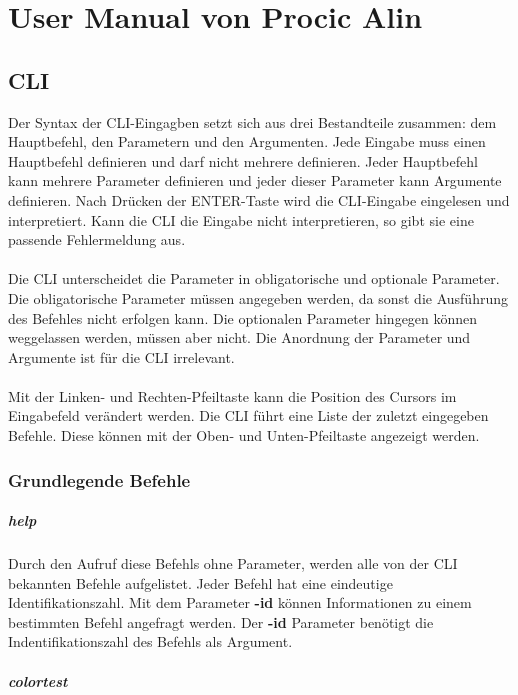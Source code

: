 \documentclass[11pt,a4paper]{report}
\begin{document}
\part{User Manual von Procic Alin}

\chapter{CLI}

Der Syntax der CLI-Eingagben setzt sich aus drei Bestandteile zusammen: dem Hauptbefehl, den Parametern und den Argumenten. Jede Eingabe muss einen Hauptbefehl definieren und darf nicht mehrere definieren. Jeder Hauptbefehl kann mehrere Parameter definieren und jeder dieser Parameter kann Argumente definieren. Nach Drücken der ENTER-Taste wird die CLI-Eingabe eingelesen und interpretiert. Kann die CLI die Eingabe nicht interpretieren, so gibt sie eine passende Fehlermeldung aus.\\\\
Die CLI unterscheidet die Parameter in obligatorische und optionale Parameter. Die obligatorische Parameter müssen angegeben werden, da sonst die Ausführung des Befehles nicht erfolgen kann. Die optionalen Parameter hingegen können weggelassen werden, müssen aber nicht. Die Anordnung der Parameter und Argumente ist für die CLI irrelevant.\\\\
Mit der Linken- und Rechten-Pfeiltaste kann die Position des Cursors im Eingabefeld verändert werden. Die CLI führt eine Liste der zuletzt eingegeben Befehle. Diese können mit der Oben- und Unten-Pfeiltaste angezeigt werden.

\section{Grundlegende Befehle}

\subsubsection{help}

Durch den Aufruf diese Befehls ohne Parameter, werden alle von der CLI bekannten Befehle aufgelistet. Jeder Befehl hat eine eindeutige Identifikationszahl. Mit dem Parameter \textbf{-id} können Informationen zu einem bestimmten Befehl angefragt werden. Der \textbf{-id} Parameter benötigt die Indentifikationszahl des Befehls als Argument.

\subsubsection{colortest}
\end{document}

